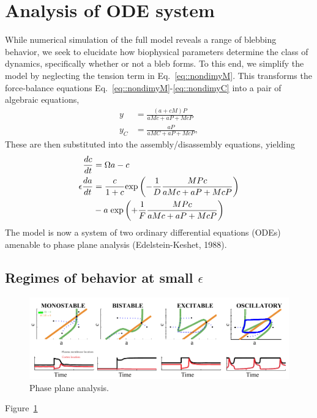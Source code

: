 \section{Analysis of ODE system}
While numerical simulation of the full model reveals a range of blebbing behavior, we seek to elucidate how biophysical parameters determine the class of dynamics, specifically whether or not a bleb forms. To this end, we simplify the model by neglecting the tension term in Eq.~\ref{eq::nondimyM}. This transforms the force-balance equations Eq.~\ref{eq::nondimyM}-\ref{eq::nondimyC} into a pair of algebraic equations,
\begin{align}
y &= \frac{(a+cM)P}{a Mc + aP + McP}\label{eq::ODEyM}\\
y_C &= \frac{aP}{a MC + aP + McP}\label{eq::ODEyC},
\end{align}
 These are then substituted into the assembly/disassembly equations, yielding
\begin{align}
\frac{d c}{dt} &= \Omega a - c \label{eq::ODEC}\\
\epsilon \frac{d a}{dt} &= \frac{c}{1+c} \mbox{exp}\left( -\frac{1}{D} \frac{MPc}{a Mc + aP + McP}\right) \notag\\
 &- a\; \mbox{exp}\left( + \frac{1}{F}\frac{MPc}{a Mc + aP + McP}\right) \label{eq::ODEA}
\end{align}
\hspace{10pt}
The model is now a system of two ordinary differential equations (ODEs) amenable to phase plane analysis (Edelstein-Keshet, 1988). 

\subsection{Regimes of behavior at small $\epsilon$}

\begin{figure}[htbp]
  \centering
  \label{fig:phasePlanes}\includegraphics[width=13cm]{figs/figODERegimes.pdf}
  \caption{Phase plane analysis.}
\end{figure}
Figure~\ref{fig:phasePlanes}



